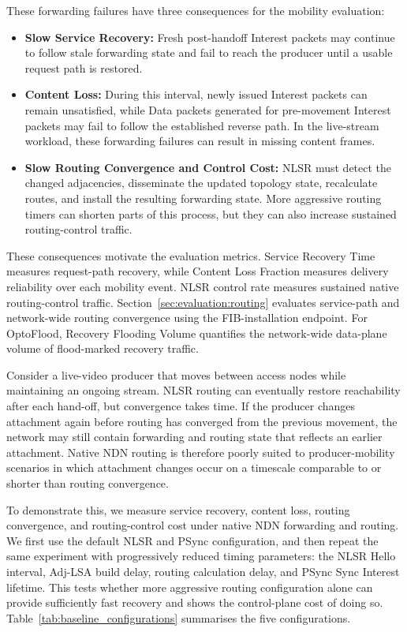 \documentclass[10pt,conference]{IEEEtran}
\begin{document}
These forwarding failures have three consequences for the mobility evaluation:

\begin{itemize}
    \item \textbf{Slow Service Recovery:} Fresh post-handoff Interest packets may continue to follow stale forwarding state and fail to reach the producer until a usable request path is restored.
    \item \textbf{Content Loss:} During this interval, newly issued Interest packets can remain unsatisfied, while Data packets generated for pre-movement Interest packets may fail to follow the established reverse path. In the live-stream workload, these forwarding failures can result in missing content frames.
    \item \textbf{Slow Routing Convergence and Control Cost:} NLSR must detect the changed adjacencies, disseminate the updated topology state, recalculate routes, and install the resulting forwarding state. More aggressive routing timers can shorten parts of this process, but they can also increase sustained routing-control traffic.
\end{itemize}

These consequences motivate the evaluation metrics. Service Recovery Time measures request-path recovery, while Content Loss Fraction measures delivery reliability over each mobility event. NLSR control rate measures sustained native routing-control traffic. Section~\ref{sec:evaluation:routing} evaluates service-path and network-wide routing convergence using the FIB-installation endpoint. For OptoFlood, Recovery Flooding Volume quantifies the network-wide data-plane volume of flood-marked recovery traffic.

Consider a live-video producer that moves between access nodes while maintaining an ongoing stream. NLSR routing can eventually restore reachability after each hand-off, but convergence takes time. If the producer changes attachment again before routing has converged from the previous movement, the network may still contain forwarding and routing state that reflects an earlier attachment. Native NDN routing is therefore poorly suited to producer-mobility scenarios in which attachment changes occur on a timescale comparable to or shorter than routing convergence.

To demonstrate this, we measure service recovery, content loss, routing convergence, and routing-control cost under native NDN forwarding and routing. We first use the default NLSR and PSync configuration, and then repeat the same experiment with progressively reduced timing parameters: the NLSR Hello interval, Adj-LSA build delay, routing calculation delay, and PSync Sync Interest lifetime. This tests whether more aggressive routing configuration alone can provide sufficiently fast recovery and shows the control-plane cost of doing so. Table~\ref{tab:baseline_configurations} summarises the five configurations.
\end{document}
